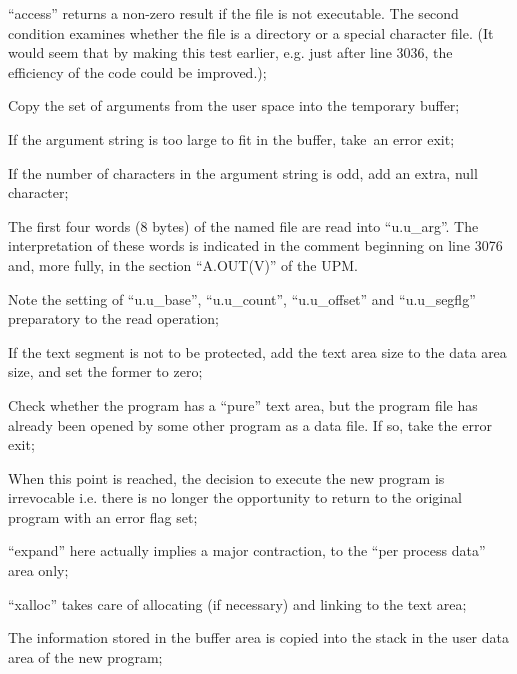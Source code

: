 \item[3041:] ``access'' returns a non-zero
result if the file is not executable. The second
condition examines whether the file is a
directory or a special character file.
(It would seem that by making
this test earlier, e.g. just
after line 3036, the efficiency
of the code could be improved.);

\item[3052:] Copy the set of arguments from
 the user space into the temporary
 buffer;

\item[3064:] If the argument string is too
large to fit in the buffer, take\
an error exit;

\item[3071:] If the number of characters in
the argument string is odd, add
an extra, null character;

\item[3090:] The first four words (8 bytes) of
 the named file are read into
 ``u.u\_arg''. The interpretation of
 these words is indicated in the
 comment beginning on line 3076
 and, more fully, in the section
 ``A.OUT(V)'' of the UPM.

Note the setting of ``u.u\_base'',
``u.u\_count'', ``u.u\_offset'' and
``u.u\_segflg'' preparatory to the
read operation;

\item[3095:] If the text segment is not to be
protected, add the text area size
to the data area size, and set the former to
zero;

\item[3105:] Check whether the program has a
``pure'' text area, but the program
file has already been opened by
some other program as a data
file. If so, take the error exit;

\item[3127:] When this point is reached, the
 decision to execute the new program is irrevocable i.e. there is
 no longer the opportunity to
 return to the original program
 with an error flag set;

\item[3129:] ``expand'' here actually implies a
major contraction, to the ``per
process data'' area only;

\item[3130:] ``xalloc'' takes care of allocating
(if necessary) and linking to the
text area;

\item[3158:] The information stored in the
 buffer area is copied into the
 stack in the user data area of
 the new program;

